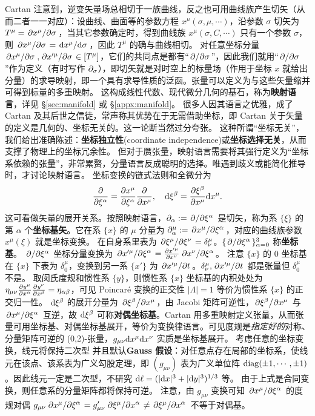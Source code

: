 Cartan 注意到，逆变矢量场总相切于一族曲线，反之也可用曲线族产生切矢（从而二者一一对应）：设曲线、曲面等的参数方程 $x^\mu(\sigma,\mu,\cdots)$，沿参数 $\sigma$ 切矢为 $T^\mu=\pdv*{x^\mu}{\sigma}$，当其它参数确定时，得到曲线族 $x^\mu(\sigma,C,\cdots)$ 只有一个参数 $\sigma$，则 $\pdv*{x^\mu}{\sigma}=\dv*{x^\mu}{\sigma}$，因此 $T^\mu$ 的确与曲线相切。
对任意坐标分量 $\pdv*{x^\mu}{\sigma},\pdv*{x'^\mu}{\sigma}\in [T^\mu]$，它们的共同点是都有“$\pdv*{\sigma}$”，因此我们就用“$\pdv*{\sigma}$”作为定义（有时写作 $\partial_\sigma$），即切矢就是对时空上的标量场（作用于坐标 $x$ 就给出分量）的求导映射，即一个具有求导性质的泛函。张量可以定义为与这些矢量缩并可得到标量的多重映射。
这构成线性代数、现代微分几何的基石，称为\textbf{映射语言}，详见 \S\ref{sec:manifold} 或 \S\ref{appx:manifold}。
很多人因其语言之优雅，成了 Cartan 及其后世之信徒，常声称其优势在于无需借助坐标，即 Cartan 关于矢量的定义是几何的、坐标无关的。这一论断当然过分夸张。
这种所谓“坐标无关”，我们给出准确陈述：\textbf{坐标独立性}(coordinate independence)或\textbf{坐标选择无关}，从而支撑了物理上的坐标冗余性。
但对于赝张量，映射语言需要将其强行定义为“坐标系依赖的张量”，非常累赘，分量语言反成聪明的选择。唯遇到歧义或能简化推导时，才讨论映射语言。
坐标变换的链式法则和全微分为
\[\pdv{\xi^\alpha}=\pdv{x^\mu}{\xi^\alpha}\pdv{x^\mu},\quad \dd\xi^\beta = \pdv{\xi^\beta}{x^\mu} \dd x^\mu.\]
这可看做矢量的展开关系。按照映射语言，$\partial_\alpha:=\pdv*{\xi^\alpha}$ 是切矢，称为系 $\{\xi\}$ 的第 $\alpha$ 个\textbf{坐标基矢}。它在系 $\{x\}$ 的 $\mu$ 分量为 $\partial_\alpha^\mu:=\pdv*{x^\mu}{\xi^\alpha}$，对应的曲线族参数 $x^\mu(\xi)$ 就是坐标变换。
在自身系里表为 $\pdv*{\xi^\mu}{\xi^\nu}=\delta^\mu_\nu$。$\{\pdv*{\xi^\alpha}\}_{\alpha=0}^3$ 称\textbf{坐标基}。
$\pdv*{\xi^\alpha}$ 坐标分量变换为 $\pdv*{x'^\mu}{\xi^\alpha}=\pdv{x'^\mu}{x^\nu}\pdv*{x^\nu}{\xi^\alpha}$。
注意 $\{x\}$ 的 $0$ 坐标基在 $\{x\}$ 下表为 $\delta^\mu_0$，变换到另一系 $\{x'\}$ 为 $\pdv*{x'^\mu}{t}$。$\delta^\mu_\nu,\pdv*{x'^\mu}{t}$ 都是张量但 $\delta^\mu_0$ 不是。
取闵氏度规和惯性系 $\{y\}$，则惯性系 $\{x\}$ 坐标基的内积处处为$\eta_{\mu\nu}\pdv{y^\mu}{x^\alpha}\pdv{y^\nu}{x^\beta}=\eta_{\alpha\beta}$，可见 Poincaré 变换的正交性 $|\Lambda|=1$ 等价为惯性系 $\{x\}$ 的正交归一性。
$\dd\xi^\beta$ 的展开分量为 $\pdv*{\xi^\beta}{x^\mu}$，由 Jacobi 矩阵可逆性，$\pdv*{\xi^\beta}{x^\mu}$ 与 $\pdv*{x^\mu}{\xi^\alpha}$ 互逆，故 $\dd\xi^\beta$ 可称\textbf{对偶坐标基}。Cartan 用多重映射定义张量，从而张量可用坐标基、对偶坐标基展开，等价为变换律语言。可见度规是\textit{指定好的}对称、分量矩阵可逆的 (0,2)-张量，$g_{\mu\nu}\dd x^\mu\dd x^\nu$ 实质是坐标基展开。
考虑任意的坐标变换，线元将保持二次型
并且默认\textbf{Gauss 假设}：对任意点存在局部的坐标系，使线元在该点、该系表为广义勾股定理，即 $(g_{\mu\nu})$ 表为广义单位阵 $\operatorname{diag}(\pm1,\cdots,\pm1)$。因此线元一定是二次型，不研究 $\dd\ell=(|\dd x|^3+|\dd y|^3)^{1/3}$ 等。
由于上式是合同变换，则任意系的分量矩阵都将保持可逆。
注意，由 $g_{\mu\nu}$ 变换可知 $\pdv*{x^\mu}{\xi^\alpha}$ 的度规对偶 $g_{\mu\nu} \pdv*{x^\mu}{\xi^\alpha} = g'_{\mu\nu} \pdv*{\xi^\mu}{x^\alpha}\ne \pdv*{\xi^\mu}{x^\alpha}$ 不等于对偶基。

